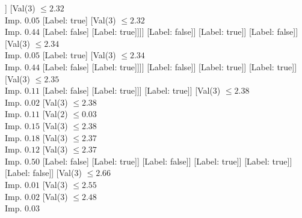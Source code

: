\documentclass[margin=10pt]{standalone}
\begin{document}
\begin{forest}
																[Val($3$) $ \leq 2.33$ \\ Imp. $0.01$
																	[Val($3$) $ \leq 2.33$ \\ Imp. $0.08$
																		[Val($3$) $ \leq 2.33$ \\ Imp. $0.02$
																			[Val($3$) $ \leq 2.33$ \\ Imp. $0.10$
																				[Val($3$) $ \leq 2.32$ \\ Imp. $0.02$
																					[Val($3$) $ \leq 2.31$ \\ Imp. $0.44$
																						[Label: true]
																						[Label: false]]
																					[Val($3$) $ \leq 2.32$ \\ Imp. $0.05$
																						[Label: true]
																						[Val($3$) $ \leq 2.32$ \\ Imp. $0.44$
																							[Label: false]
																							[Label: true]]]]
																				[Label: false]]
																			[Label: true]]
																		[Label: false]]
																	[Val($3$) $ \leq 2.34$ \\ Imp. $0.05$
																		[Label: true]
																		[Val($3$) $ \leq 2.34$ \\ Imp. $0.44$
																			[Label: false]
																			[Label: true]]]]
																[Label: false]]
															[Label: true]]
														[Label: true]]
													[Val($3$) $ \leq 2.35$ \\ Imp. $0.11$
														[Label: false]
														[Label: true]]]
												[Label: true]]
											[Val($3$) $ \leq 2.38$ \\ Imp. $0.02$
												[Val($3$) $ \leq 2.38$ \\ Imp. $0.11$
													[Val($2$) $ \leq 0.03$ \\ Imp. $0.15$
														[Val($3$) $ \leq 2.38$ \\ Imp. $0.18$
															[Val($3$) $ \leq 2.37$ \\ Imp. $0.12$
																[Val($3$) $ \leq 2.37$ \\ Imp. $0.50$
																	[Label: false]
																	[Label: true]]
																[Label: false]]
															[Label: true]]
														[Label: true]]
													[Label: false]]
												[Val($3$) $ \leq 2.66$ \\ Imp. $0.01$
													[Val($3$) $ \leq 2.55$ \\ Imp. $0.02$
														[Val($3$) $ \leq 2.48$ \\ Imp. $0.03$

\end{forest}
\end{document}
